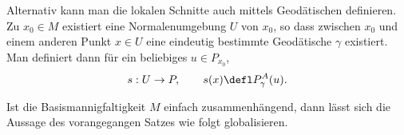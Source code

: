 \documentclass[%
	paper=a5,%
	fleqn,%
	DIV=18,%
	BCOR=0mm,
	fontsize=11pt,
	titlepage=false,%
	bibliography=totoc,
	DIV=18,%
	twoside=true,
	pdftitle=Riemannsche Geometrie,
	pdfauthor=Uwe Semmelmann,
	numbers=noendperiod]%
	{scrbook}
\begin{document}

\begin{rem}
Alternativ kann man die lokalen Schnitte auch mittels Geodätischen definieren.
Zu $x_0\in M$ existiert eine Normalenumgebung $U$ von $x_0$, so dass zwischen
$x_0$ und einem anderen Punkt $x\in U$ eine eindeutig bestimmte Geod\"atische $\gamma$ existiert. Man definiert dann für ein beliebiges $u\in
P_{x_0}$,
\begin{align*}
s: U\to P,\qquad s(x)\defl P_\gamma^A(u). 
\end{align*}
\end{rem}

Ist die Basismannigfaltigkeit $M$ einfach zusammenhängend, dann lässt sich
die Aussage des vorangegangen Satzes wie folgt globalisieren.
\end{document}
